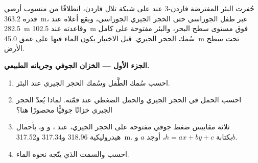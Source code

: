 \begin{problem}
\label{pb:b3:hydrogeology:1}
حُفرت البئر المفترضة فاردن-3 عند  على شبكة
تلال فاردن، انطلاقًا من منسوب أرضي قدره \qty{363.2}{m}، عبر
طفل الجوراسي حتى الحجر الجيري الجوراسي، ويقع أعلاه عند
\qty{282.5}{m} وقاعدته عند \qty{102.5}{m} فوق مستوى سطح البحر، والبئر مفتوحة
على كامل سُمك الحجر الجيري. قبل الاختبار يكون الماء فيها على عمق
\qty{45.0}{m} تحت سطح الأرض.

\medskip\noindent\textbf{الجزء الأول --- الخزان الجوفي وجريانه الطبيعي.}
\begin{enumerate}
\item احسب سُمك الطَّفل وسُمك الحجر الجيري عند البئر.
\item احسب الحمل في الحجر الجيري والحمل الضغطي عند قمّته.
  لماذا يُعدّ الحجر الجيري خزانًا جوفيًّا محصورًا هنا؟
\item ثلاثة مقاييس ضغط جوفي مفتوحة على الحجر الجيري، عند ،
  و و، بأحمال هيدروليكية 318.96 و317.34
  و\qty{317.52}{m}. بكتابة $h = ax + by + c$، أوجد $a$ و$b$.
\item احسب  والسمت الذي يتّجه نحوه
  الماء.
\end{enumerate}


\end{problem}

